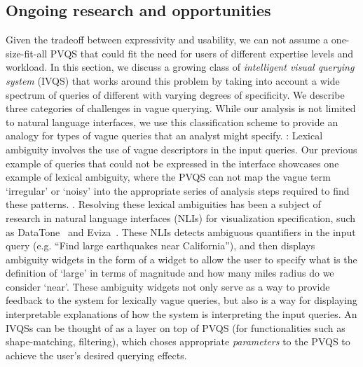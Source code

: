 \subsection{Ongoing research and opportunities}
\par Given the tradeoff between expressivity and usability, we can not assume a one-size-fit-all PVQS that could fit the need for users of different expertise levels and workload. In this section, we discuss a growing class of \textit{intelligent visual querying system} (IVQS) that works around this problem by taking into account a wide spectrum of queries of different with varying degrees of specificity. We describe three categories of challenges in vague querying. While our analysis is not limited to natural language interfaces, we use this classification scheme to provide an analogy for types of vague queries that an analyst might specify.
: Lexical ambiguity involves the use of vague descriptors in the input queries. Our previous example of queries that could not be expressed in the \zv interface showcases one example of lexical ambiguity, where the PVQS can not map the vague term `irregular' or `noisy' into the appropriate series of analysis steps required to find these patterns. . Resolving these lexical ambiguities has been a subject of research in natural language interfaces (NLIs) for visualization specification, such as DataTone~\cite{Gao2015} and Eviza~\cite{Setlur2016}. These NLIs detects ambiguous quantifiers in the input query (e.g. ``Find large earthquakes near California''), and then displays ambiguity widgets in the form of a widget to allow the user to specify what is the definition of `large' in terms of magnitude and how many miles radius do we consider `near'. These ambiguity widgets not only serve as a way to provide feedback to the system for lexically vague queries, but also is a way for displaying interpretable explanations of how the system is interpreting the input queries. An IVQSs can be thought of as a layer on top of PVQS (for functionalities such as shape-matching, filtering), which choses appropriate \textit{parameters} to the PVQS to achieve the user's desired querying effects.
